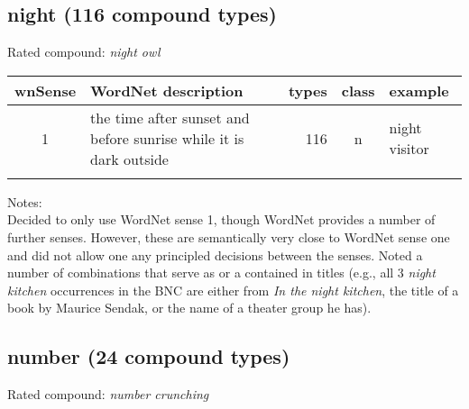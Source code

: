 \subsection{night        (116 compound types)}
Rated compound: \emph{night owl}

\vspace*{-1ex}

\noindent
\begin{longtable}{c>{\raggedright\arraybackslash}p{5cm}rc>{\raggedright\arraybackslash}p{2cm}}\lsptoprule
{\small wnSense}&WordNet description&types&class&example\\\midrule
1&the time after sunset and before sunrise while it is dark outside&116&n&night visitor\\\lspbottomrule
\end{longtable}

\noindent
Notes:\\
Decided to only use WordNet sense 1, though WordNet provides a number
of further senses. However, these are semantically very close to
WordNet sense one and did not allow one any principled decisions
between the senses. Noted a number of combinations that serve as or a
contained in
titles (e.g., all 3 \emph{night kitchen} occurrences in the BNC are either from \emph{In the night
  kitchen}, the title of a book by Maurice Sendak, or the name of a
theater group he has).

\vspace*{-.4cm}
\subsection{number       (24 compound types)}
Rated compound: \emph{number crunching}

\vspace*{-.5ex}

